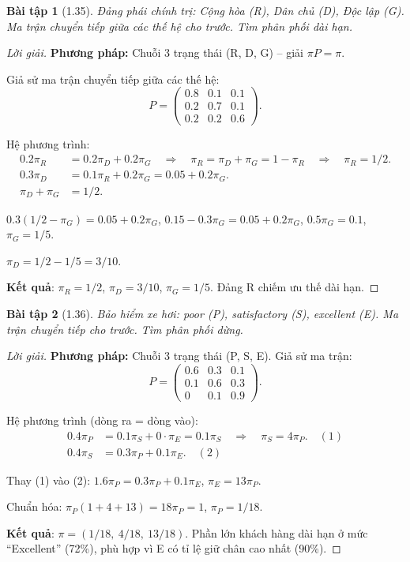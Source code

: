 \documentclass[8pt,a4paper]{article}
\newtheorem{exercise}{Bài tập}
\newenvironment{solution}{\begin{proof}[Lời giải]}{\end{proof}}
\begin{document}
\begin{exercise}[1.35]
Đảng phái chính trị: Cộng hòa (R), Dân chủ (D), Độc lập (G). Ma trận chuyển tiếp giữa các thế hệ cho trước. Tìm phân phối dài hạn.
\end{exercise}
\begin{solution}
\textbf{Phương pháp:} Chuỗi 3 trạng thái (R, D, G) -- giải $\pi P = \pi$.

Giả sử ma trận chuyển tiếp giữa các thế hệ:
\[
  P = \begin{pmatrix} 0.8 & 0.1 & 0.1 \\ 0.2 & 0.7 & 0.1 \\ 0.2 & 0.2 & 0.6 \end{pmatrix}.
\]

Hệ phương trình:
\begin{align*}
  0.2\pi_R &= 0.2\pi_D + 0.2\pi_G \quad \Rightarrow \quad \pi_R = \pi_D + \pi_G = 1 - \pi_R \quad \Rightarrow \quad \pi_R = 1/2. \\
  0.3\pi_D &= 0.1\pi_R + 0.2\pi_G = 0.05 + 0.2\pi_G. \\
  \pi_D + \pi_G &= 1/2.
\end{align*}

$0.3(1/2 - \pi_G) = 0.05 + 0.2\pi_G$, $0.15 - 0.3\pi_G = 0.05 + 0.2\pi_G$, $0.5\pi_G = 0.1$, $\pi_G = 1/5$.

$\pi_D = 1/2 - 1/5 = 3/10$.

\textbf{Kết quả}: $\pi_R = 1/2$, $\pi_D = 3/10$, $\pi_G = 1/5$. Đảng R chiếm ưu thế dài hạn.
\end{solution}

\begin{exercise}[1.36]
Bảo hiểm xe hơi: poor (P), satisfactory (S), excellent (E). Ma trận chuyển tiếp cho trước. Tìm phân phối dừng.
\end{exercise}
\begin{solution}
\textbf{Phương pháp:} Chuỗi 3 trạng thái (P, S, E). Giả sử ma trận:
\[
  P = \begin{pmatrix} 0.6 & 0.3 & 0.1 \\ 0.1 & 0.6 & 0.3 \\ 0 & 0.1 & 0.9 \end{pmatrix}.
\]

Hệ phương trình (dòng ra = dòng vào):
\begin{align*}
  0.4\pi_P &= 0.1\pi_S + 0\cdot\pi_E = 0.1\pi_S \quad \Rightarrow \quad \pi_S = 4\pi_P. \quad (1) \\
  0.4\pi_S &= 0.3\pi_P + 0.1\pi_E. \quad (2)
\end{align*}

Thay (1) vào (2): $1.6\pi_P = 0.3\pi_P + 0.1\pi_E$, $\pi_E = 13\pi_P$.

Chuẩn hóa: $\pi_P(1 + 4 + 13) = 18\pi_P = 1$, $\pi_P = 1/18$.

\textbf{Kết quả}: $\pi = (1/18,\ 4/18,\ 13/18)$. Phần lớn khách hàng dài hạn ở mức ``Excellent'' (72\%), phù hợp vì E có tỉ lệ giữ chân cao nhất (90\%).
\end{solution}
\end{document}
